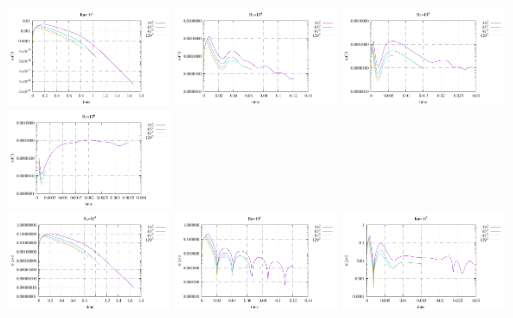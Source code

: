 \begin{center}
\includegraphics[width=4.297cm]{python_codes/fieldstone_155/results/conv_T_Ra1e3}
\includegraphics[width=4.297cm]{python_codes/fieldstone_155/results/conv_T_Ra1e4}
\includegraphics[width=4.297cm]{python_codes/fieldstone_155/results/conv_T_Ra1e5}
\includegraphics[width=4.297cm]{python_codes/fieldstone_155/results/conv_T_Ra1e6}\\
\includegraphics[width=4.297cm]{python_codes/fieldstone_155/results/conv_psi_Ra1e3}
\includegraphics[width=4.297cm]{python_codes/fieldstone_155/results/conv_psi_Ra1e4}
\includegraphics[width=4.297cm]{python_codes/fieldstone_155/results/conv_psi_Ra1e5}

\end{center}
